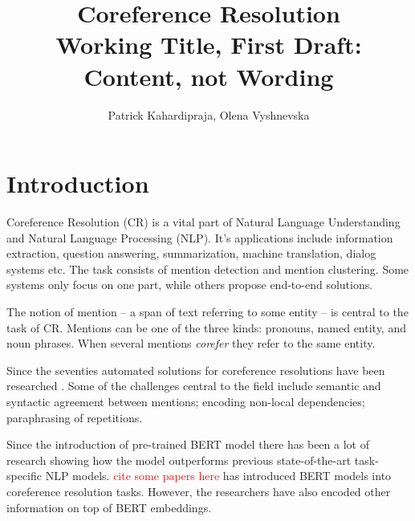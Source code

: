 \documentclass[11pt]{article}
\title{{\LARGE Coreference Resolution}\\[1.5mm]
{\large Working Title, First Draft: Content, not Wording}\\[1.5mm]} %
\author{Patrick Kahardipraja, Olena Vyshnevska}%
\date{} %
\newcommand\todo[1]{\textcolor{red}{#1}}
\begin{document}
\maketitle


\section{Introduction}


Coreference Resolution (CR) is a vital part of Natural Language Understanding and Natural Language Processing (NLP). It's applications include information extraction, question answering, summarization, machine translation, dialog systems etc. The task consists of mention detection and mention clustering. Some systems only focus on one part, while others propose end-to-end solutions.

The notion of mention -- a span of text referring to some entity -- is central to the task of CR. Mentions can be one of the three kinds: pronouns, named entity, and noun phrases. When several mentions \textit{corefer} they refer to the same entity. 

Since the seventies automated solutions for coreference resolutions have been researched \parencite{woods1972, winograd1972, hobbs1978}. Some of the challenges central to the field include semantic and syntactic agreement between mentions; encoding non-local dependencies; paraphrasing of repetitions.





Since the introduction of pre-trained BERT model  \parencite{devlin2019bert} there has been a lot of research showing how the model outperforms previous state-of-the-art task-specific NLP models. \todo{cite some papers here} %
\textcite{joshi2019coref} has introduced BERT models into coreference resolution tasks. However, the researchers have also encoded other information on top of BERT embeddings. 
\end{document}
